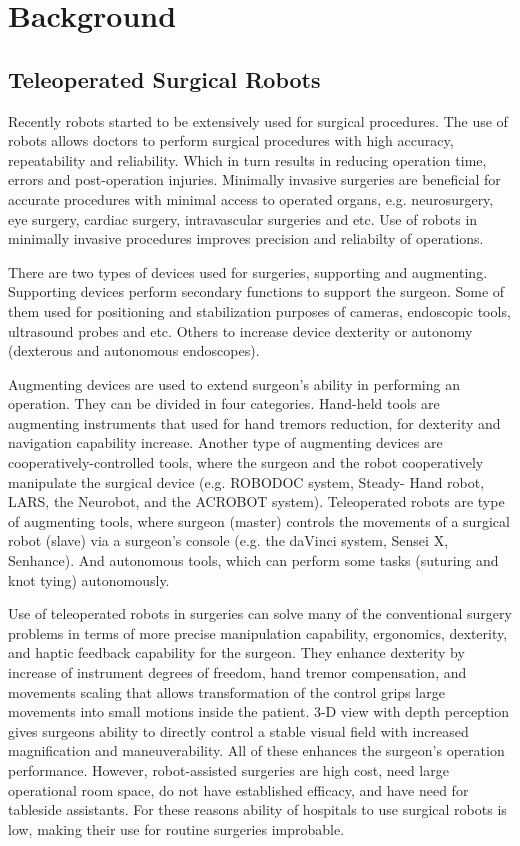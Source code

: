 \chapter{Background}
\label{back}

\section{Teleoperated Surgical Robots}
\label{sec:daVinci}
Recently robots started to be extensively used for surgical procedures. The use of robots allows doctors to perform surgical procedures with high accuracy, repeatability and reliability. Which in turn results in reducing operation time, errors and post-operation injuries. Minimally invasive surgeries are beneficial for accurate procedures with minimal access to operated organs, e.g. neurosurgery, eye surgery, cardiac surgery, intravascular surgeries and etc.  Use of robots in minimally invasive procedures improves precision and reliabilty of operations. \cite{tavakoli_haptics_2008}

There are two types of devices used for surgeries, supporting and augmenting. 
Supporting devices perform secondary functions to support the surgeon.  Some of them used for positioning and stabilization purposes of cameras, endoscopic tools, ultrasound probes and etc. Others to increase device dexterity or autonomy (dexterous and autonomous endoscopes).

Augmenting devices are used to extend surgeon's ability in performing an operation. They can be divided in four categories. Hand-held tools are augmenting instruments that used for hand tremors reduction, for dexterity and navigation capability increase. Another type of augmenting devices are cooperatively-controlled tools, where the surgeon and the robot cooperatively manipulate the surgical device (e.g. ROBODOC system, Steady- Hand robot, LARS, the Neurobot, and the ACROBOT system). Teleoperated robots are type of augmenting tools, where surgeon (master) controls the movements of a surgical robot (slave) via a surgeon's console (e.g. the daVinci system, Sensei X, Senhance). And autonomous tools, which can perform some tasks (suturing and knot tying) autonomously. \cite{tavakoli_haptics_2008}

Use of teleoperated robots in surgeries can solve many of the conventional surgery problems in terms of more precise manipulation capability, ergonomics, dexterity, and haptic feedback capability for the surgeon. They enhance dexterity by increase of instrument degrees of freedom, hand tremor compensation, and movements scaling that allows transformation of the control grips large movements into small motions inside the patient. 3-D view with depth perception gives surgeons ability to directly control a stable visual field with increased magnification and maneuverability. All of these enhances the surgeon's operation performance. However, robot-assisted surgeries are high cost, need large operational room space, do not have established efficacy, and have need for tableside assistants. For these reasons ability of hospitals to use surgical robots is low, making their use for routine surgeries improbable. \cite{tavakoli_haptics_2008}

